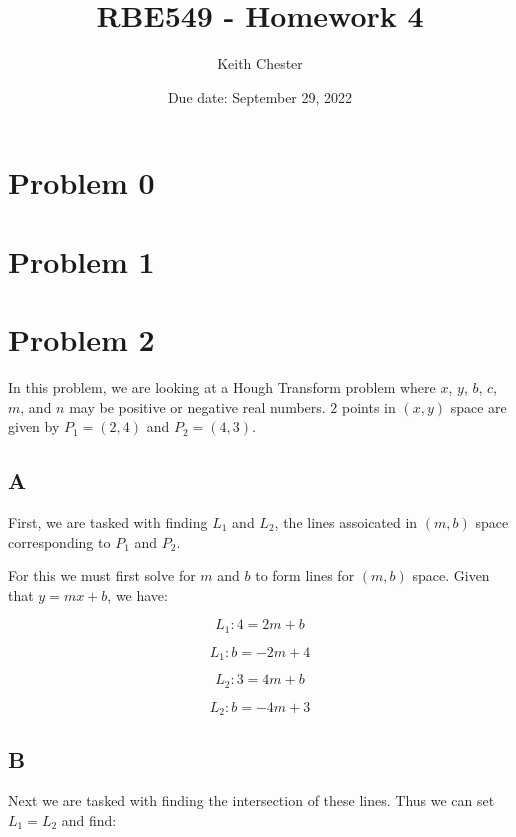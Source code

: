 \documentclass{article}
\title{RBE549 - Homework 4}
\author{Keith Chester}
\date{Due date: September 29, 2022}
\begin{document}
\maketitle

\section*{Problem 0}


\section*{Problem 1}


\section*{Problem 2}

In this problem, we are looking at a Hough Transform problem where $x$, $y$, $b$, $c$, $m$, and $n$ may be positive or negative real numbers. $2$ points in $(x,y)$ space are given by $P_1=(2,4)$ and $P_2=(4,3)$.

\subsection*{A}

First, we are tasked with finding $L_1$ and $L_2$, the lines assoicated in $(m,b)$ space corresponding to $P_1$ and $P_2$.

For this we must first solve for $m$ and $b$ to form lines for $(m,b)$ space. Given that $y = mx + b$, we have:

\begin{equation}
    L_1: 4 = 2m + b
\end{equation}

\begin{equation}
    L_1: b = -2m + 4
\end{equation}

\begin{equation}
    L_2: 3 = 4m + b
\end{equation}

\begin{equation}
    L_2: b = -4m + 3
\end{equation}

\subsection*{B}

Next we are tasked with finding the intersection of these lines. Thus we can set $L_1=L_2$ and find:
\end{document}

